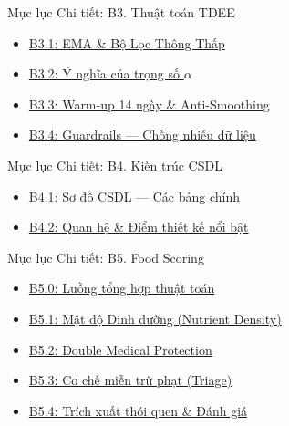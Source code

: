 \documentclass[10pt, aspectratio=169]{beamer}
\begin{document}
\begin{frame}[label=subtoc_b3]{Mục lục Chi tiết: B3. Thuật toán TDEE}
\hypertarget{subtoc_b3_target}{}
    \vspace{0.5cm}
    \begin{itemize}
        \setlength\itemsep{0.5cm}
        \Large
        \item[\textcolor{NutriDark}{$\blacktriangleright$}] \hyperlink{b3_1_target}{B3.1: EMA \& Bộ Lọc Thông Thấp}
        \item[\textcolor{NutriDark}{$\blacktriangleright$}] \hyperlink{b3_2_target}{B3.2: Ý nghĩa của trọng số $\alpha$}
        \item[\textcolor{NutriDark}{$\blacktriangleright$}] \hyperlink{b3_3_target}{B3.3: Warm-up 14 ngày \& Anti-Smoothing}
        \item[\textcolor{NutriDark}{$\blacktriangleright$}] \hyperlink{b3_4_target}{B3.4: Guardrails — Chống nhiễu dữ liệu}
    \end{itemize}
\end{frame}

\begin{frame}[label=subtoc_b4]{Mục lục Chi tiết: B4. Kiến trúc CSDL}
\hypertarget{subtoc_b4_target}{}
    \vspace{0.5cm}
    \begin{itemize}
        \setlength\itemsep{0.5cm}
        \Large
        \item[\textcolor{NutriDark}{$\blacktriangleright$}] \hyperlink{b4_1_target}{B4.1: Sơ đồ CSDL — Các bảng chính}
        \item[\textcolor{NutriDark}{$\blacktriangleright$}] \hyperlink{b4_2_target}{B4.2: Quan hệ \& Điểm thiết kế nổi bật}
    \end{itemize}
\end{frame}

\begin{frame}[label=subtoc_b5]{Mục lục Chi tiết: B5. Food Scoring}
\hypertarget{subtoc_b5_target}{}
    \vspace{0.5cm}
    \begin{itemize}
        \setlength\itemsep{0.5cm}
        \Large
        \item[\textcolor{NutriDark}{$\blacktriangleright$}] \hyperlink{b5_0_target}{B5.0: Luồng tổng hợp thuật toán}
        \item[\textcolor{NutriDark}{$\blacktriangleright$}] \hyperlink{b5_1_target}{B5.1: Mật độ Dinh dưỡng (Nutrient Density)}
        \item[\textcolor{NutriDark}{$\blacktriangleright$}] \hyperlink{b5_2_target}{B5.2: Double Medical Protection}
        \item[\textcolor{NutriDark}{$\blacktriangleright$}] \hyperlink{b5_3_target}{B5.3: Cơ chế miễn trừ phạt (Triage)}
        \item[\textcolor{NutriDark}{$\blacktriangleright$}] \hyperlink{b5_4_target}{B5.4: Trích xuất thói quen \& Đánh giá}
    \end{itemize}
\end{frame}
\end{document}
